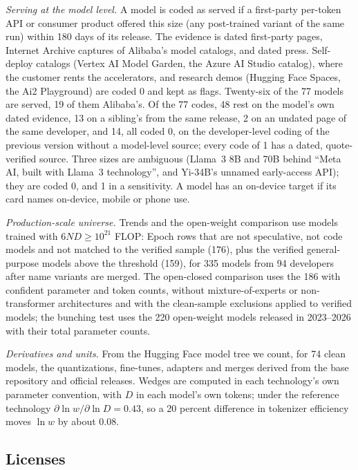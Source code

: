 \textit{Serving at the model level.} A model is coded as served if a first-party per-token API or consumer product
offered this size (any post-trained variant of the same run) within 180 days of its release. The evidence is dated
first-party pages, Internet Archive captures of Alibaba's model catalogs, and dated press. Self-deploy catalogs (Vertex AI
Model Garden, the Azure AI Studio catalog), where the customer rents the accelerators, and research demos (Hugging Face
Spaces, the Ai2 Playground) are coded 0 and kept as flags. Twenty-six of the 77 models are served, 19 of them Alibaba's.
Of the 77 codes, 48 rest on the model's own dated evidence, 13 on a sibling's from the same release, 2 on an undated page
of the same developer, and 14, all coded 0, on the developer-level coding of the previous version without a model-level
source; every code of 1 has a dated, quote-verified source. Three sizes are ambiguous (Llama~3 8B and 70B behind ``Meta
AI, built with Llama~3 technology'', and Yi-34B's unnamed early-access API); they are coded 0, and 1 in a sensitivity. A model
has an on-device target if its card names on-device, mobile or phone use.

\textit{Production-scale universe.} Trends and the open-weight comparison use models trained with $6ND\ge10^{21}$ FLOP:
Epoch rows that are not speculative, not code models and not matched to the verified sample (176), plus the verified
general-purpose models above the threshold (159), for 335 models from 94 developers after name variants are merged. The
open-closed comparison uses the 186 with confident parameter and token counts, without mixture-of-experts or
non-transformer architectures and with the clean-sample exclusions applied to verified models; the bunching test uses
the 220 open-weight models released in 2023--2026 with their total parameter counts.

\textit{Derivatives and units.} From the Hugging Face model tree we count, for 74 clean models, the quantizations,
fine-tunes, adapters and merges derived from the base repository and official releases. Wedges are computed in each
technology's own parameter convention, with $D$ in each model's own tokens; under the reference technology
$\partial\ln w/\partial\ln D=0.43$, so a 20 percent difference in tokenizer efficiency moves $\ln w$ by about 0.08.

\subsection{Licenses}\label{app:licenses}

